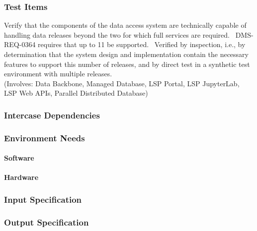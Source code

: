 \subsubsection{Test Items}
Verify that the components of the data access system are technically
capable of handling data releases beyond the two for which full services
are required. ~DMS-REQ-0364 requires that up to 11 be supported.
~Verified by inspection, i.e., by determination that the system design
and implementation contain the necessary features to support this number
of releases, and by direct test in a synthetic test environment with
multiple releases.\\
(Involves: Data Backbone, Managed Database, LSP Portal, LSP JupyterLab,
LSP Web APIs, Parallel Distributed Database)



\subsubsection{Intercase Dependencies}

\subsubsection{Environment Needs}

\paragraph{Software}

\paragraph{Hardware}

\subsubsection{Input Specification}

\subsubsection{Output Specification}

